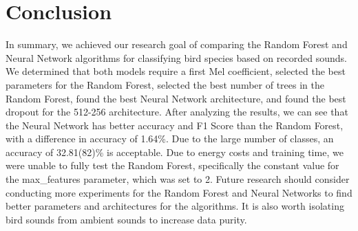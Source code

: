 \documentclass[
onecolumn,
]{ceurart}
\begin{document}
  \section{Conclusion}
  
  In summary, we achieved our research goal of comparing the Random Forest and Neural Network algorithms for classifying bird species based on recorded sounds. We determined that both models require a first Mel coefficient, selected the best parameters for the Random Forest, selected the best number of trees in the Random Forest, found the best Neural Network architecture, and found the best dropout for the 512-256 architecture. After analyzing the results, we can see that the Neural Network has better accuracy and F1 Score than the Random Forest, with a difference in accuracy of 1.64\%. Due to the large number of classes, an accuracy of 32.81(82)\% is acceptable. Due to energy costs and training time, we were unable to fully test the Random Forest, specifically the constant value for the max\_features parameter, which was set to 2. Future research should consider conducting more experiments for the Random Forest and Neural Networks to find better parameters and architectures for the algorithms. It is also worth isolating bird sounds from ambient sounds to increase data purity.
	
	
	
\end{document}
